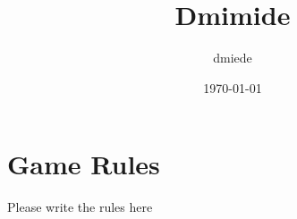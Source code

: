 \documentclass{article}%
\title{Dmimide}%
\author{dmiede}%
\date{\today}%
\begin{document}
%
\pagestyle{empty}%
\normalsize%
\maketitle%
\section{Game Rules}%
\label{sec:GameRules}%
Please write the rules here

%
\end{document}
